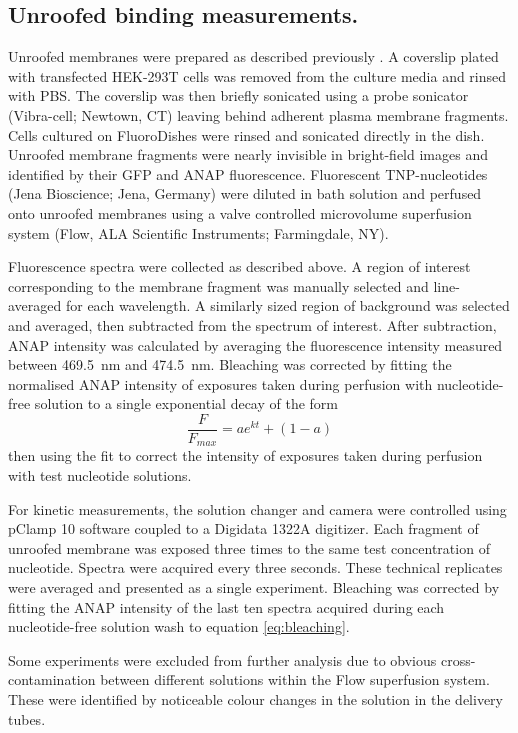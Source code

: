 \documentclass[10pt,lineno, doublespacing]{elife_modified}
\begin{document}
\subsection{Unroofed binding measurements.}
Unroofed membranes were prepared as described previously \citep{RN21, RN22, RN80}.
A coverslip plated with transfected HEK-293T cells was removed from the culture media and rinsed with PBS.
The coverslip was then briefly sonicated using a probe sonicator (Vibra-cell; Newtown, CT) leaving behind adherent plasma membrane fragments.
Cells cultured on FluoroDishes were rinsed and sonicated directly in the dish.
Unroofed membrane fragments were nearly invisible in bright-field images and identified by their GFP and ANAP fluorescence.
Fluorescent TNP-nucleotides (Jena Bioscience; Jena, Germany) were diluted in bath solution and perfused onto unroofed membranes using a valve controlled microvolume superfusion system (\si{\micro}Flow, ALA Scientific Instruments; Farmingdale, NY).

Fluorescence spectra were collected as described above.
A region of interest corresponding to the membrane fragment was manually selected and line-averaged for each wavelength.
A similarly sized region of background was selected and averaged, then subtracted from the spectrum of interest.
After subtraction, ANAP intensity was calculated by averaging the fluorescence intensity measured between \SI{469.5}{\nano\metre} and \SI{474.5}{\nano\metre}.
Bleaching was corrected by fitting the normalised ANAP intensity of exposures taken during perfusion with nucleotide-free solution to a single exponential decay of the form
\begin{equation} \label{eq:bleaching}
    \frac{F}{F_{max}} = ae^{kt} + (1 - a)
\end{equation}
then using the fit to correct the intensity of exposures taken during perfusion with test nucleotide solutions.

For kinetic measurements, the solution changer and camera were controlled using pClamp 10 software coupled to a Digidata 1322A digitizer.
Each fragment of unroofed membrane was exposed three times to the same test concentration of nucleotide.
Spectra were acquired every three seconds.
These technical replicates were averaged and presented as a single experiment.
Bleaching was corrected by fitting the ANAP intensity of the last ten spectra acquired during each nucleotide-free solution wash to equation \ref{eq:bleaching}.

Some experiments were excluded from further analysis due to obvious cross-contamination between different solutions within the \si{\micro}Flow superfusion system.
These were identified by noticeable colour changes in the solution in the delivery tubes.
\end{document}
